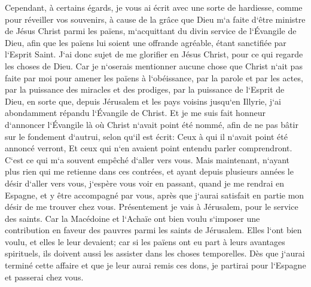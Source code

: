 \verse Cependant, à certains égards, je vous ai écrit avec une sorte de hardiesse, comme pour réveiller vos souvenirs, à cause de la grâce que Dieu m`a faite 
\verse d`être ministre de Jésus Christ parmi les païens, m`acquittant du divin service de l`Évangile de Dieu, afin que les païens lui soient une offrande agréable, étant sanctifiée par l`Esprit Saint. 
\verse J`ai donc sujet de me glorifier en Jésus Christ, pour ce qui regarde les choses de Dieu. 
\verse Car je n`oserais mentionner aucune chose que Christ n`ait pas faite par moi pour amener les païens à l`obéissance, par la parole et par les actes, 
\verse par la puissance des miracles et des prodiges, par la puissance de l`Esprit de Dieu, en sorte que, depuis Jérusalem et les pays voisins jusqu`en Illyrie, j`ai abondamment répandu l`Évangile de Christ. 
\verse Et je me suis fait honneur d`annoncer l`Évangile là où Christ n`avait point été nommé, afin de ne pas bâtir sur le fondement d`autrui, selon qu`il est écrit: 
\verse Ceux à qui il n`avait point été annoncé verront, Et ceux qui n`en avaient point entendu parler comprendront. 
\verse C`est ce qui m`a souvent empêché d`aller vers vous. 
\verse Mais maintenant, n`ayant plus rien qui me retienne dans ces contrées, et ayant depuis plusieurs années le désir d`aller vers vous, 
\verse j`espère vous voir en passant, quand je me rendrai en Espagne, et y être accompagné par vous, après que j`aurai satisfait en partie mon désir de me trouver chez vous. 
\verse Présentement je vais à Jérusalem, pour le service des saints. 
\verse Car la Macédoine et l`Achaïe ont bien voulu s`imposer une contribution en faveur des pauvres parmi les saints de Jérusalem. 
\verse Elles l`ont bien voulu, et elles le leur devaient; car si les païens ont eu part à leurs avantages spirituels, ils doivent aussi les assister dans les choses temporelles. 
\verse Dès que j`aurai terminé cette affaire et que je leur aurai remis ces dons, je partirai pour l`Espagne et passerai chez vous. 

